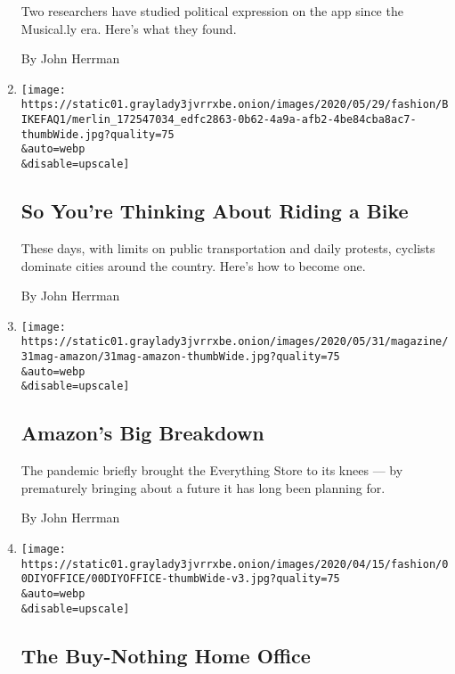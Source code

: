 \begin{enumerate}
  Two researchers have studied political expression on the app since the
  Musical.ly era. Here's what they found.

  By John Herrman
\item
  \href{/2020/06/18/style/bike-buying-commute-exercise-questions.html}{}

  \texttt{[image: https://static01.graylady3jvrrxbe.onion/images/2020/05/29/fashion/BIKEFAQ1/merlin\_172547034\_edfc2863-0b62-4a9a-afb2-4be84cba8ac7-thumbWide.jpg?quality=75\\\&auto=webp\\\&disable=upscale]}

  \hypertarget{so-youre-thinking-about-riding-a-bike}{%
  \subsection{So You're Thinking About Riding a
  Bike}\label{so-youre-thinking-about-riding-a-bike}}

  These days, with limits on public transportation and daily protests,
  cyclists dominate cities around the country. Here's how to become one.

  By John Herrman
\item
  \href{/interactive/2020/05/27/magazine/amazon-coronavirus.html}{}

  \texttt{[image: https://static01.graylady3jvrrxbe.onion/images/2020/05/31/magazine/31mag-amazon/31mag-amazon-thumbWide.jpg?quality=75\\\&auto=webp\\\&disable=upscale]}

  \hypertarget{amazons-big-breakdown}{%
  \subsection{Amazon's Big Breakdown}\label{amazons-big-breakdown}}

  The pandemic briefly brought the Everything Store to its knees --- by
  prematurely bringing about a future it has long been planning for.

  By John Herrman
\item
  \href{/2020/04/15/style/working-from-home-setup.html}{}

  \texttt{[image: https://static01.graylady3jvrrxbe.onion/images/2020/04/15/fashion/00DIYOFFICE/00DIYOFFICE-thumbWide-v3.jpg?quality=75\\\&auto=webp\\\&disable=upscale]}

  \hypertarget{the-buy-nothing-home-office}{%
  \subsection{The Buy-Nothing Home
  Office}\label{the-buy-nothing-home-office}}


\end{enumerate}

